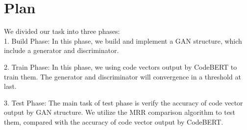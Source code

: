
\section{Plan}
{We divided our task into three phases:\\


1. Build Phase: In this phase, we build and implement a GAN structure, which include a generator and discriminator.


2. Train Phase: In this phase, we using code vectors output by CodeBERT to train them. The generator and discriminator will convergence in a threshold at last.


3. Test Phase: The main task of test phase is verify the accuracy of code vector output by GAN structure. We utilize the MRR comparison algorithm to test them, compared with the accuracy of code vector output by CodeBERT.
}
